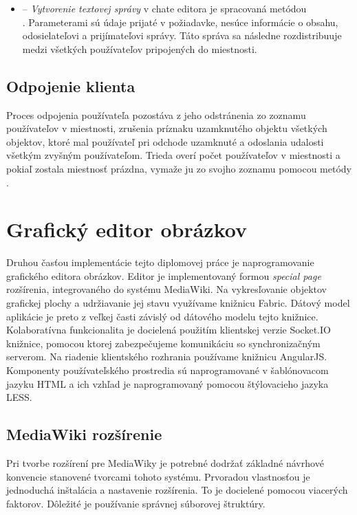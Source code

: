 \begin{itemize}
	\item {} -- \textit{Vytvorenie textovej správy} v chate editora je spracovaná metódou \\ . Parameterami sú údaje prijaté v požiadavke, nesúce informácie o obsahu, odosielateľovi a prijímateľovi správy. Táto správa sa následne rozdistribuuje medzi všetkých používateľov pripojených do miestnosti.
	
\end{itemize}

\subsection{Odpojenie klienta}
Proces odpojenia používateľa pozostáva z jeho odstránenia zo zoznamu používateľov v miestnosti, zrušenia príznaku uzamknutého objektu všetkých objektov, ktoré mal používateľ pri odchode uzamknuté a odoslania udalosti všetkým zvyšným používateľom. Trieda  overí počet používateľov v miestnosti a pokiaľ zostala miestnosť prázdna, vymaže ju zo svojho zoznamu pomocou metódy .





\section{Grafický editor obrázkov}
Druhou časťou implementácie tejto diplomovej práce je naprogramovanie grafického editora obrázkov. Editor je implementovaný formou \textit{special page} rozšírenia, integrovaného do systému MediaWiki. Na vykresľovanie objektov grafickej plochy a udržiavanie jej stavu využívame knižnicu Fabric. Dátový model aplikácie je preto z veľkej časti závislý od dátového modelu tejto knižnice. Kolaboratívna funkcionalita je docielená použitím klientskej verzie Socket.IO knižnice, pomocou ktorej zabezpečujeme komunikáciu so synchronizačným serverom. Na riadenie klientského rozhrania používame knižnicu AngularJS. Komponenty používateľského prostredia sú naprogramované v šablónovacom jazyku HTML a ich vzhľad je naprogramovaný pomocou štýlovacieho jazyka LESS.

\subsection{MediaWiki rozšírenie}
Pri tvorbe rozšírení pre MediaWiky je potrebné dodržať základné návrhové konvencie stanovené tvorcami tohoto systému. Prvoradou vlastnosťou je jednoduchá inštalácia a nastavenie rozšírenia. To je docielené pomocou viacerých faktorov. Dôležité je používanie správnej súborovej štruktúry. 

